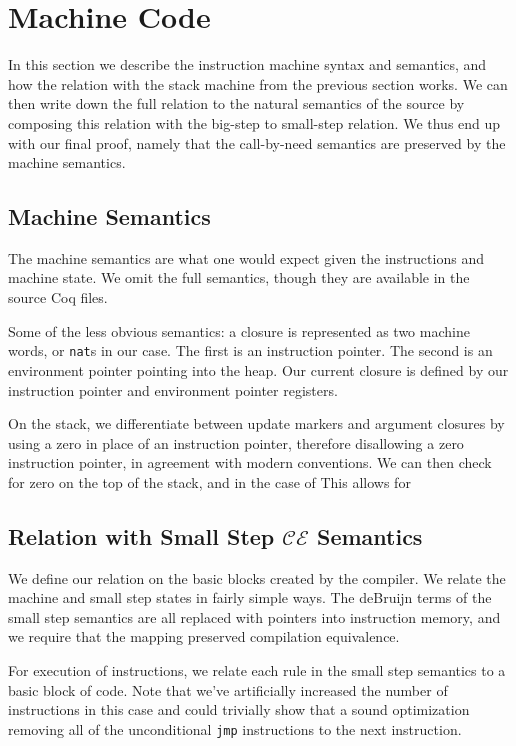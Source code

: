 \section{Machine Code} \label{sec:mach}

In this section we describe the instruction machine syntax and semantics, and
how the relation with the stack machine from the previous section works. We can
then write down the full relation to the natural semantics of the source by
composing this relation with the big-step to small-step relation. We thus end
up with our final proof, namely that the call-by-need semantics are preserved
by the machine semantics. 

\subsection{Machine Semantics}

The machine semantics are what one would expect given the instructions and
machine state. We omit the full semantics, though they are available in the
source Coq files.

Some of the less obvious semantics: a closure is represented as two machine
words, or \texttt{nat}s in our case. The first is an instruction pointer. The
second is an environment pointer pointing into the heap. Our current closure is
defined by our instruction pointer and environment pointer registers. 

On the stack, we differentiate between update markers and argument closures by
using a zero in place of an instruction pointer, therefore disallowing a zero
instruction pointer, in agreement with modern conventions. We can then check for
zero on the top of the stack, and in the case of This allows for  

\subsection{Relation with Small Step $\mathcal{CE}$ Semantics}

We define our relation on the basic blocks created by the compiler. We relate
the machine and small step states in fairly simple ways. The deBruijn terms of
the small step semantics are all replaced with pointers into instruction memory,
and we require that the mapping preserved compilation equivalence. 

For execution of instructions, we relate each rule in the small step semantics
to a basic block of code. Note that we've artificially increased the number of
instructions in this case and could trivially show that a sound optimization
removing all of the unconditional \texttt{jmp} instructions to the next
instruction. 

